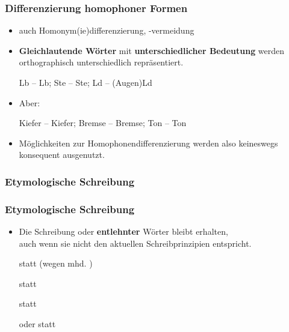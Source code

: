 \begin{frame}
\frametitle{Differenzierung homophoner Formen}

\begin{itemize}
	
	\item auch Homonym(ie)differenzierung, -vermeidung
	
	\item \textbf{Gleichlautende Wörter} mit \textbf{unterschiedlicher Bedeutung} werden orthographisch unterschiedlich repräsentiert.
	
	\ea Lb -- Lb; Ste -- Ste; Ld -- (Augen)Ld
	\z
	
	\item Aber:
	
	\ea Kiefer -- Kiefer; Bremse -- Bremse; Ton -- Ton
	\z
	
	\item Möglichkeiten zur Homophonendifferenzierung werden also keineswegs konsequent ausgenutzt.
\end{itemize}

\end{frame}


\subsubsection{Etymologische Schreibung}

\begin{frame}
\frametitle{Etymologische Schreibung}

\begin{itemize}
	\item Die Schreibung  oder \textbf{entlehnter} Wörter bleibt erhalten,\\
	auch wenn sie nicht den aktuellen Schreibprinzipien entspricht.
	
	\eal
		\ex {} statt  (wegen mhd. )
		
		\ex {} statt 
		
		\ex {} statt 
		
		\ex {} oder  statt 
	\zl

\end{itemize}

\end{frame}


